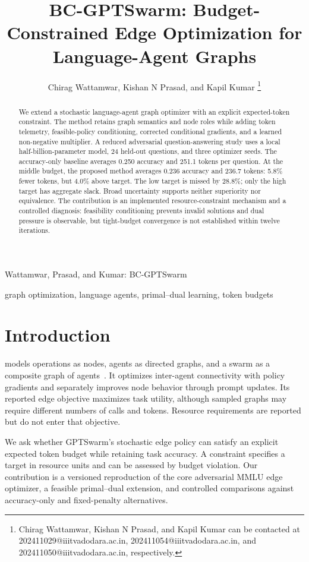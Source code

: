 \documentclass[journal]{IEEEtran}
\title{BC-GPTSwarm: Budget-Constrained Edge Optimization for Language-Agent Graphs}
\author{Chirag Wattamwar, Kishan N Prasad, and Kapil Kumar%
\thanks{Chirag Wattamwar, Kishan N Prasad, and Kapil Kumar can be contacted at 202411029@iiitvadodara.ac.in, 202411054@iiitvadodara.ac.in, and 202411050@iiitvadodara.ac.in, respectively.}}
\begin{document}
{Wattamwar, Prasad, and Kumar: BC-GPTSwarm}
\maketitle
\begin{abstract}
We extend a stochastic language-agent graph optimizer with an explicit expected-token constraint. The method retains graph semantics and node roles while adding token telemetry, feasible-policy conditioning, corrected conditional gradients, and a learned non-negative multiplier. A reduced adversarial question-answering study uses a local half-billion-parameter model, 24 held-out questions, and three optimizer seeds. The accuracy-only baseline averages 0.250 accuracy and 251.1 tokens per question. At the middle budget, the proposed method averages 0.236 accuracy and 236.7 tokens: 5.8\% fewer tokens, but 4.0\% above target. The low target is missed by 28.8\%; only the high target has aggregate slack. Broad uncertainty supports neither superiority nor equivalence. The contribution is an implemented resource-constraint mechanism and a controlled diagnosis: feasibility conditioning prevents invalid solutions and dual pressure is observable, but tight-budget convergence is not established within twelve iterations.
\end{abstract}
\begin{IEEEkeywords}
graph optimization, language agents, primal--dual learning, token budgets
\end{IEEEkeywords}

\IEEEpeerreviewmaketitle

\section{Introduction}
 models operations as nodes, agents as directed graphs, and a swarm as a composite graph of agents~\cite{pmlr-v235-zhuge24a}. It optimizes inter-agent connectivity with policy gradients and separately improves node behavior through prompt updates. Its reported edge objective maximizes task utility, although sampled graphs may require different numbers of calls and tokens. Resource requirements are reported but do not enter that objective.

We ask whether GPTSwarm's stochastic edge policy can satisfy an explicit expected token budget while retaining task accuracy. A constraint specifies a target in resource units and can be assessed by budget violation. Our contribution is a versioned reproduction of the core adversarial MMLU edge optimizer, a feasible primal--dual extension, and controlled comparisons against accuracy-only and fixed-penalty alternatives.
\end{document}
